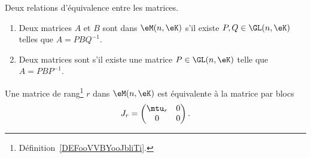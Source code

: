\begin{definition}  \label{DefBLELooTvlHoB}
    Deux relations d'équivalence entre les matrices.
    \begin{enumerate}
        \item   \label{ItemPFXCooOUbSCt}
    Deux matrices \( A\) et \( B\) sont  dans \( \eM(n,\eK)\) s'il existe \( P,Q\in\GL(n,\eK)\) telles que \( A=PBQ^{-1}\).
\item
    Deux matrices sont  s'il existe une matrice \( P\in \GL(n,\eK)\) telle que \( A=PBP^{-1}\).
    \end{enumerate}
\end{definition}

\begin{lemma}   \label{LemZMxxnfM}
    Une matrice de rang\footnote{Définition~\ref{DEFooVVBYooJbliTi}.} \( r\) dans \( \eM(n,\eK)\) est équivalente à la matrice par blocs
    \begin{equation}
        J_r=\begin{pmatrix}
            \mtu_r    &   0    \\
            0    &   0
        \end{pmatrix}.
    \end{equation}
\end{lemma}

